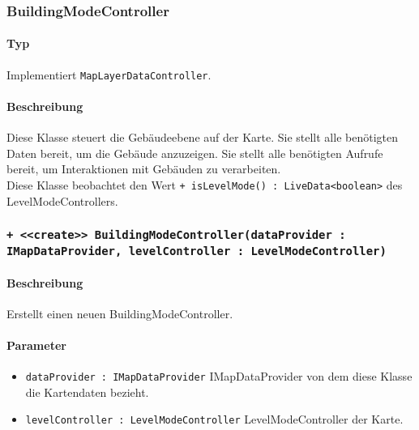 \subsubsection{BuildingModeController}
\paragraph*{Typ}
Implementiert \texttt{MapLayerDataController}.
\paragraph*{Beschreibung}
Diese Klasse steuert die Gebäudeebene auf der Karte. Sie stellt alle benötigten Daten bereit, um die Gebäude anzuzeigen. 
Sie stellt alle benötigten Aufrufe bereit, um Interaktionen mit Gebäuden zu verarbeiten.\\
Diese Klasse beobachtet den Wert \texttt{+ isLevelMode() : LiveData<boolean>} des LevelModeControllers.

\subsubsection*{\texttt{+ <<create>> BuildingModeController(dataProvider : IMapDataProvider, levelController : LevelModeController)}}%
\paragraph*{Beschreibung}
Erstellt einen neuen BuildingModeController.
\paragraph*{Parameter}
\begin{itemize}
    \item \texttt{dataProvider : IMapDataProvider} IMapDataProvider von dem diese Klasse die Kartendaten bezieht.
    \item \texttt{levelController : LevelModeController} LevelModeController der Karte.
\end{itemize}

